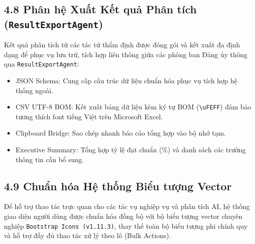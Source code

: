 \documentclass[12pt,a4paper]{report}
\begin{document}
\subsection*{4.8 Phân hệ Xuất Kết quả Phân tích (\texttt{ResultExportAgent})}
Kết quả phân tích từ các tác tử thẩm định được đóng gói và kết xuất đa định dạng để phục vụ lưu trữ, tích hợp liên thông giữa các phòng ban Đảng ủy thông qua \texttt{ResultExportAgent}:
\begin{itemize}[label=--,leftmargin=*]
  \item JSON Schema: Cung cấp cấu trúc dữ liệu chuẩn hóa phục vụ tích hợp hệ thống ngoài.
  \item CSV UTF-8 BOM: Kết xuất bảng dữ liệu kèm ký tự BOM (\texttt{\textbackslash uFEFF}) đảm bảo tương thích font tiếng Việt trên Microsoft Excel.
  \item Clipboard Bridge: Sao chép nhanh báo cáo tổng hợp vào bộ nhớ tạm.
  \item Executive Summary: Tổng hợp tỷ lệ đạt chuẩn (\%) và danh sách các trường thông tin cần bổ sung.
\end{itemize}

\subsection*{4.9 Chuẩn hóa Hệ thống Biểu tượng Vector}
Để hỗ trợ thao tác trực quan cho các tác vụ nghiệp vụ và phân tích AI, hệ thống giao diện người dùng được chuẩn hóa đồng bộ với bộ biểu tượng vector chuyên nghiệp \texttt{Bootstrap Icons (v1.11.3)}, thay thế toàn bộ biểu tượng phi chính quy và hỗ trợ đầy đủ thao tác xử lý theo lô (Bulk Actions).
\end{document}
